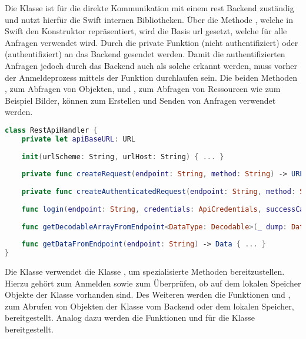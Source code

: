 Die Klasse  ist für die direkte Kommunikation mit einem \gls{rest} Backend zuständig und nutzt hierfür die Swift internen Bibliotheken.
Über die Methode , welche in Swift den Konstruktor repräsentiert, wird die Basis \gls{url} gesetzt, welche für alle Anfragen verwendet wird.
Durch die private Funktion  (nicht authentifiziert) oder  (authentifiziert) an das Backend gesendet werden. Damit die authentifizierten Anfragen jedoch durch das Backend auch als solche erkannt werden, muss vorher der Anmeldeprozess mittels der Funktion  durchlaufen sein.
Die beiden Methoden , zum Abfragen von Objekten, und , zum Abfragen von Ressourcen wie zum Beispiel Bilder, können zum Erstellen und Senden von Anfragen verwendet werden.

\begin{lstlisting}[language=Swift]
class RestApiHandler {
    private let apiBaseURL: URL
    
    init(urlScheme: String, urlHost: String) { ... }
    
    private func createRequest(endpoint: String, method: String) -> URLRequest { ... }
    
    private func createAuthenticatedRequest(endpoint: String, method: String, token: String) -> URLRequest { ... }
    
    func login(endpoint: String, credentials: ApiCredentials, successCallback: @escaping (_ result: String)->(), errorCallback: @escaping (_ result: String)->()) { ... }
    
    func getDecodableArrayFromEndpoint<DataType: Decodable>(_ dump: DataType.Type, token: String, endpoint: String, method: String, successCallback: @escaping (_ result: [DataType])->(), errorCallback: @escaping (_ result: String)->()) { ... }
    
    func getDataFromEndpoint(endpoint: String) -> Data { ... }
}
\end{lstlisting}

\clearpage

Die Klasse  verwendet die Klasse , um spezialisierte Methoden bereitzustellen.
Hierzu gehört  zum Anmelden sowie  zum Überprüfen, ob auf dem lokalen Speicher Objekte der Klasse  vorhanden sind.
Des Weiteren werden die Funktionen  und , zum Abrufen von Objekten der Klasse  vom Backend oder dem lokalen Speicher, bereitgestellt. Analog dazu werden die Funktionen  und  für die Klasse  bereitgestellt.

